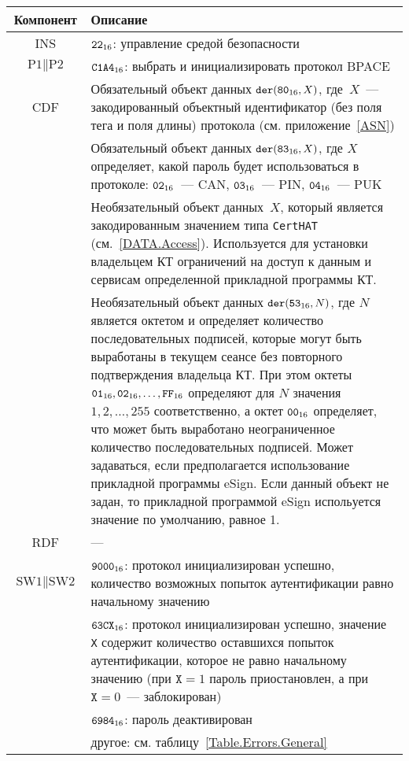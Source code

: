 \begin{table}[h]
\caption{}\label{Table.Oper.SetBPACECmd}
\begin{tabular}{|c|p{14cm}|}
\hline
Компонент & Описание \\
\hline
\hline
INS & $\texttt{22}_{16}$: управление средой безопасности\\ 
\hline
$\text{P1} \parallel\text{P2}$ & $\texttt{C1A4}_{16}$: выбрать и 
инициализировать протокол BPACE\\ 
\hline
CDF & Обязательный объект данных 
$\texttt{der}(\texttt{80}_{16}, X)$, где~$X$~--- 
закодированный объектный идентификатор (без поля тега и поля 
длины) протокола (см. приложение~\ref{ASN})\\
& Обязательный объект данных $\texttt{der}(\texttt{83}_{16}, X)$, 
где $X$ определяет, какой пароль будет использоваться в протоколе: 
$\texttt{02}_{16}$~--- CAN,  $\texttt{03}_{16}$~--- PIN, 
$\texttt{04}_{16}$~--- PUK\\
 & Необязательный объект данных~$X$, который является 
закодированным значением типа \verb|CertHAT| (см.~\ref{DATA.Access}). 
Используется для установки владельцем 
КТ ограничений на доступ к данным и сервисам определенной 
прикладной программы КТ.\\
 & Необязательный объект данных $\texttt{der}(\texttt{53}_{16}, N)$, 
где $N$ является октетом и 
определяет количество последовательных подписей, 
которые могут быть выработаны в текущем сеансе 
без повторного подтверждения владельца КТ.
При этом октеты $\texttt{01}_{16}, \texttt{02}_{16}, \ldots, \texttt{FF}_{16}$
определяют для $N$ значения $1, 2, \ldots, 255$ соответственно, 
а октет $\texttt{00}_{16}$ определяет, что может быть выработано 
неограниченное количество последовательных подписей. 
Может задаваться, если предполагается использование 
прикладной программы eSign.  
Если данный объект не задан, то прикладной программой eSign 
испольуется значение по умолчанию, равное 1. \\
\hline 
RDF &  --- \\
\hline
$\text{SW1} \parallel \text{SW2}$ & 
  $\texttt{9000}_{16}$: протокол инициализирован успешно,
количество возможных попыток аутентификации равно начальному значению \\
 & $\texttt{63CX}_{16}$: протокол инициализирован успешно,
значение \texttt{X} содержит количество 
оставшихся попыток аутентификации, которое не равно начальному значению
(при $\texttt{X} = 1$ пароль приостановлен, а при $\texttt{X} = 0$~--- заблокирован)\\
& $\texttt{6984}_{16}$: пароль деактивирован \\
 & другое: см. таблицу~\ref{Table.Errors.General} \\
\hline
\end{tabular}
\end{table}


